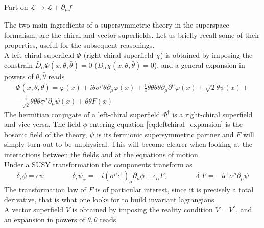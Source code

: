 \documentclass[12pt]{article}
\begin{document}
\newpage
Part on $\mathcal{L} \to \mathcal{L} + \partial_\mu f$ \\
\raggedright The two main ingredients of a supersymmetric theory in the superspace formalism, are the chiral and vector superfields. Let us briefly recall some of their properties, useful for the subsequent reasonings. \\
\vspace{15pt}
A left-chiral superfield $\Phi$ (right-chiral superfield $\chi$) is obtained by imposing the constrain $\bar D_{\dot \alpha} \Phi(x, \theta, \bar\theta) = 0$  ($D_{\alpha} \chi(x, \theta, \bar\theta) = 0$), and a general expansion in powers of $\theta, \bar\theta$ reads
\begin{equation}
\begin{gathered}
  \Phi(x, \theta, \bar\theta) = \varphi(x) + i\bar\theta \bar\sigma^{\mu}\theta \partial_{\mu}\varphi(x) + \frac{1}{4}\theta\theta\bar\theta\bar\theta\partial_{\mu}\partial^{\mu}\varphi(x) + \sqrt{2}\theta\psi(x) + \\ 
                -\frac{i}{\sqrt{2}}\theta\theta\bar\theta\bar\sigma^{\mu}\partial_{\mu}\psi(x) + \theta\theta F(x)
\end{gathered}
\label{eq:leftchiral_expansion}
\end{equation}
The hermitian conjugate of a left-chiral superfield $\Phi^\dagger$ is a right-chiral superfield and vice-versa.
The field $\phi$ entering equation \ref{eq:leftchiral_expansion} is the bosonic field of the theory, $\psi$ is its fermionic supersymmetric partner and $F$ will simply turn out to be unphysical. This will become clearer when looking at the interactions between the fields and at the equations of motion. \\
Under a SUSY transformation the components transform as 
\begin{gather*}
  \delta_{\epsilon} \phi =\epsilon \psi \qquad\qquad
  \delta_{\epsilon} \psi_{\alpha} =-i\left(\sigma^{\mu} \epsilon^{\dagger}\right)_{\alpha} \partial_{\mu} \phi+\epsilon_{\alpha} F, \qquad\qquad
  \boxed{\delta_{\epsilon} F =-i \epsilon^{\dagger} \bar{\sigma}^{\mu} \partial_{\mu} \psi}
\end{gather*}
The transformation law of $F$ is of particular interest, since it is precisely a total derivative, that is what one looks for to build invariant lagrangians. \\
\vspace{15pt}
A vector superfield $V$ is obtained by imposing the reality condition $V=V^*$, and an expansion in powers of $\theta, \bar\theta$ reads
\end{document}
